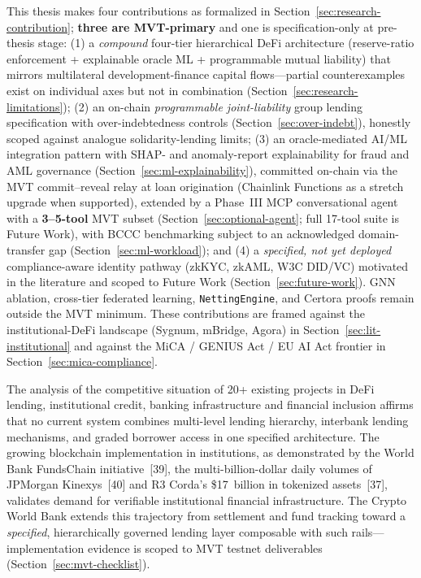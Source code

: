 \documentclass[12pt,a4paper]{report}
\begin{document}
This thesis makes four contributions as formalized in Section~\ref{sec:research-contribution}; \textbf{three are MVT-primary} and one is specification-only at pre-thesis stage: (1) a \textit{compound} four-tier hierarchical DeFi architecture (reserve-ratio enforcement + explainable oracle ML + programmable mutual liability) that mirrors multilateral development-finance capital flows---partial counterexamples exist on individual axes but not in combination (Section~\ref{sec:research-limitations}); (2) an on-chain \textit{programmable joint-liability} group lending specification with over-indebtedness controls (Section~\ref{sec:over-indebt}), honestly scoped against analogue solidarity-lending limits; (3) an oracle-mediated AI/ML integration pattern with SHAP- and anomaly-report explainability for fraud and AML governance (Section~\ref{sec:ml-explainability}), committed on-chain via the MVT commit--reveal relay at loan origination (Chainlink Functions as a stretch upgrade when supported), extended by a Phase~III MCP conversational agent with a \textbf{3--5-tool} MVT subset (Section~\ref{sec:optional-agent}; full 17-tool suite is Future Work), with BCCC benchmarking subject to an acknowledged domain-transfer gap (Section~\ref{sec:ml-workload}); and (4) a \textit{specified, not yet deployed} compliance-aware identity pathway (zkKYC, zkAML, W3C DID/VC) motivated in the literature and scoped to Future Work (Section~\ref{sec:future-work}). GNN ablation, cross-tier federated learning, \texttt{NettingEngine}, and Certora proofs remain outside the MVT minimum. These contributions are framed against the institutional-DeFi landscape (Sygnum, mBridge, Agora) in Section~\ref{sec:lit-institutional} and against the MiCA / GENIUS Act / EU AI Act frontier in Section~\ref{sec:mica-compliance}.

The analysis of the competitive situation of 20+ existing projects in DeFi lending, institutional credit, banking infrastructure and financial inclusion affirms that no current system combines multi-level lending hierarchy, interbank lending mechanisms, and graded borrower access in one specified architecture. The growing blockchain implementation in institutions, as demonstrated by the World Bank FundsChain initiative~[39], the multi-billion-dollar daily volumes of JPMorgan Kinexys~[40] and R3 Corda's \$17~billion in tokenized assets~[37], validates demand for verifiable institutional financial infrastructure. The Crypto World Bank extends this trajectory from settlement and fund tracking toward a \textit{specified}, hierarchically governed lending layer composable with such rails---implementation evidence is scoped to MVT testnet deliverables (Section~\ref{sec:mvt-checklist}).
\end{document}
